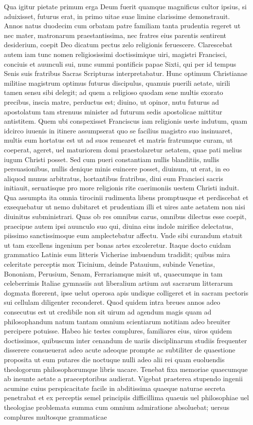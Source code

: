 \documentclass[a5paper,twoside]{article}
\begin{document}
Qua igitur pietate primum erga Deum fuerit quamque magnificus cultor ipsius, si aduixisset, futurus erat, in primo uitae suae limine clarissime demonstrauit. Annos natus duodecim cum orbatam patre familiam tanta prudentia regeret ut nec mater, matronarum praestantissima, nec fratres eius parentis sentirent desiderium, coepit Deo dicatum pectus zelo religionis feruescere. Clarescebat autem iam tunc nomen religiosissimi doctissimique uiri, magistri Francisci, conciuis et auunculi sui, nunc summi pontificis papae Sixti, qui per id tempus Senis suis fratribus Sacras Scripturas interpretabatur. Hunc optimum Christianae militiae magistrum optimus futurus discipulus, quamuis puerili aetate, uirili tamen sensu sibi delegit; ad quem a religioso quodam sene multis exorato precibus, inscia matre, perductus est; diuino, ut opinor, nutu futurus ad apostolatum tam strenuus minister ad futurum sedis apostolicae mittitur antistitem. Quem ubi conspexisset Franciscus iam religionis ueste indutum, quam idcirco iuuenis in itinere assumpserat quo se facilius magistro suo insinuaret, multis eum hortatus est ut ad suos remearet et matris fratrumque curam, ut coeperat, ageret, uel maturiorem domi praestolaretur aetatem, quae pati melius iugum Christi posset. Sed cum pueri constantiam nullis blanditiis, nullis persuasionibus, nullis denique minis euincere posset, diuinum, ut erat, in eo aliquod munus arbitratus, hortantibus fratribus, diui eum Francisci sacris initiauit, seruatisque pro more religionis rite caerimoniis uestem Christi induit. Qua assumpta ita omnia tirocinii rudimenta libens promptusque et perdiscebat et exsequebatur ut nemo dubitaret et prudentiam illi et uires ante aetatem non nisi diuinitus subministrari. Quas ob res omnibus carus, omnibus dilectus esse coepit, praecipue autem ipsi auunculo suo qui, diuina eius indole mirifice delectatus, piissimo sanctissimoque eum amplectebatur affectu. Vnde sibi curandum statuit ut tam excellens ingenium per bonas artes excoleretur. Itaque docto cuidam grammatico Latinis eum litteris Vicheriae imbuendum tradidit; quibus mira celeritate perceptis mox Ticinium, deinde Patauium, subinde Venetias, Bononiam, Perusium, Senam, Ferrariamque misit ut, quaecumque in tam celeberrimis Italiae gymnasiis aut liberalium artium aut sacrarum litterarum dogmata florerent, ipse uelut operosa apis undique colligeret et in sacram pectoris sui cellulam diligenter reconderet. Quod quidem intra breues annos adeo consecutus est ut credibile non sit uirum ad agendum magis quam ad philosophandum natum tantam omnium scientiarum notitiam adeo breuiter percipere potuisse. Habeo hic testes complures, familiares eius, uiros quidem doctissimos, quibuscum inter cenandum de uariis disciplinarum studiis frequenter disserere consueuerat adeo acute adeoque prompte ac subtiliter de quaestione proposita ut eum putares die noctuque nulli adeo alii rei quam euoluendis theologorum philosophorumque libris uacare. Tenebat fixa memoriae quaecumque ab ineunte aetate a praeceptoribus audierat. Vigebat praeterea stupendo ingenii acumine cuius perspicacitate facile in abditissima quaeque naturae secreta penetrabat et ex perceptis semel principiis difficillima quaeuis uel philosophiae uel theologiae problemata summa cum omnium admiratione absoluebat; uersus complures multosque grammaticae 
\end{document}
